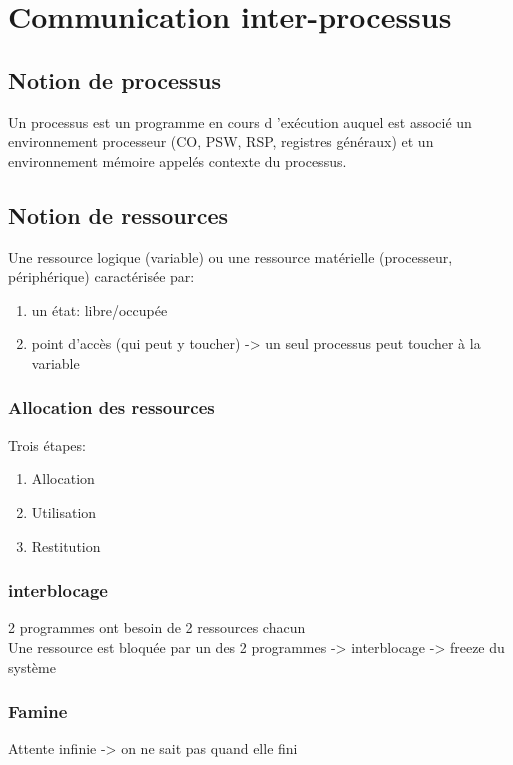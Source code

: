 \chapter{Communication inter-processus}
\section{Notion de processus}
Un processus est un programme en cours d ’exécution auquel est associé un
environnement processeur (CO, PSW, RSP, registres généraux) et un environnement
mémoire appelés contexte du processus.

\section{Notion de ressources}
Une ressource logique (variable) ou une ressource matérielle (processeur, périphérique) caractérisée par:
\begin{enumerate}
\item un état: libre/occupée
\item point d'accès (qui peut y toucher) -> un seul processus peut toucher à la variable
\end{enumerate}

\subsection{Allocation des ressources}
Trois étapes:
\begin{enumerate}
\item Allocation
\item Utilisation
\item Restitution
\end{enumerate}

\subsection{interblocage}
2 programmes ont besoin de 2 ressources chacun \\
Une ressource est bloquée par un des 2 programmes -> interblocage -> freeze du système

\subsection{Famine}
Attente infinie -> on ne sait pas quand elle fini

